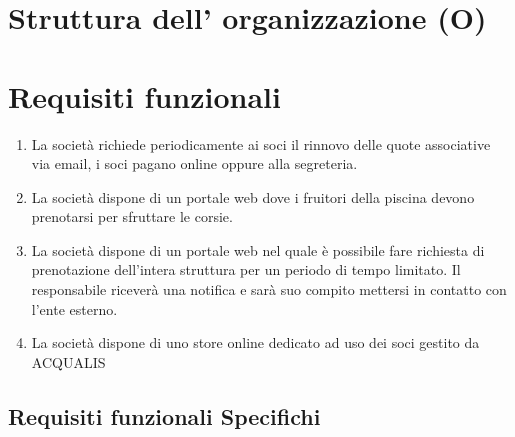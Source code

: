 \documentclass[11pt]{article} %
\begin{document}
\section{Struttura dell' organizzazione (O)}

\section{Requisiti funzionali}

\begin{enumerate}
	\item La società richiede periodicamente ai soci il rinnovo delle quote associative via email, i soci pagano online oppure alla segreteria.
	\item La società dispone di un portale web dove i fruitori della piscina devono prenotarsi per sfruttare le corsie.
	\item La società dispone di un portale web nel quale è possibile fare richiesta di prenotazione dell'intera struttura per un periodo di tempo limitato. Il responsabile riceverà una notifica e sarà suo compito mettersi in contatto con l'ente esterno.
	\item La società dispone di uno store online dedicato ad uso dei soci gestito da ACQUALIS
\end{enumerate}


\subsection{Requisiti funzionali Specifichi}
\end{document}
